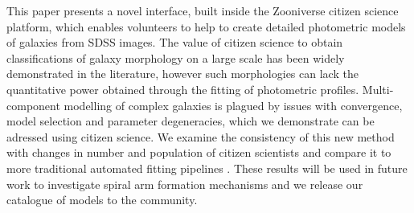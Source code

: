 \documentclass[../main.tex]{subfiles}
\begin{document}
This paper presents a novel interface, built inside the Zooniverse citizen science platform, which enables volunteers to help to create detailed photometric models of galaxies from SDSS images. The value of citizen science to obtain classifications of galaxy morphology on a large scale has been widely demonstrated in the literature, however such morphologies can lack the quantitative power obtained through the fitting of photometric profiles. Multi-component modelling of complex galaxies is plagued by issues with convergence, model selection and parameter degeneracies, which we demonstrate can be adressed using citizen science. We examine the consistency of this new method with changes in number and population of citizen scientists and compare it to more traditional automated fitting pipelines . These results will be used in future work to investigate spiral arm formation mechanisms and we release our catalogue of models to the community.
\end{document}
